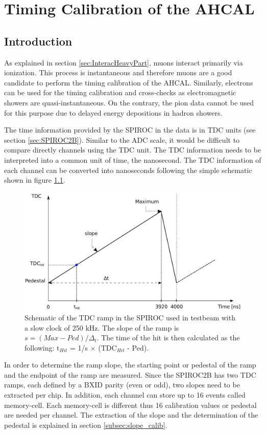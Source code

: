 \chapter{Timing Calibration of the AHCAL}
\label{chap:TimingCalib}

\section{Introduction}
\label{sec:TimingIntro}

As explained in section \ref{sec:InteracHeavyPart}, muons interact primarily via ionization. This process is instantaneous and therefore muons are a good candidate to perform the timing calibration of the AHCAL. Similarly, electrons can be used for the timing calibration and cross-checks as electromagnetic showers are quasi-instantaneous. On the contrary, the pion data cannot be used for this purpose due to delayed energy depositions in hadron showers.

The time information provided by the SPIROC in the data is in TDC units (see section \ref{sec:SPIROC2B}). Similar to the ADC scale, it would be difficult to compare directly channels using the TDC unit. The TDC information needs to be interpreted into a common unit of time, the nanosecond. The TDC information of each channel can be converted into nanoseconds following the simple schematic shown in figure \ref{fig:ConvertTime}.

\begin{figure}[htbp!]
  \centering
  \includegraphics[width=0.7\linewidth]{chap5/fig_AHCAL_Timing/Others/TDCRamp.eps}
  \caption{Schematic of the TDC ramp in the SPIROC used in testbeam with a slow clock of 250 kHz. The slope of the ramp is $s = (Max-Ped)/\Delta_t$. The time of the hit is then calculated as the following: t$_{Hit}$ = 1/s $\times$ (TDC$_{Hit}$ - Ped).} \label{fig:ConvertTime}
\end{figure}

In order to determine the ramp slope, the starting point or pedestal of the ramp and the endpoint of the ramp are measured. Since the SPIROC2B has two TDC ramps, each defined by a BXID parity (even or odd), two slopes need to be extracted per chip. In addition, each channel can store up to 16 events called memory-cell. Each memory-cell is different thus 16 calibration values or pedestal are needed per channel. The extraction of the slope and the determination of the pedestal is explained in section \ref{subsec:slope_calib}.

